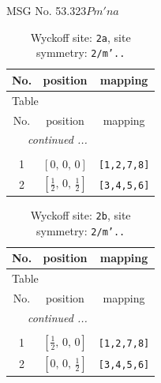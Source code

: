 \documentclass[fleqn,8pt]{jsarticle}
\begin{document}
\setcounter{MaxMatrixCols}{32}

\renewcommand{\tablename}{Table~}
\renewcommand{\figurename}{Figure~}
\begin{center}
\LARGE
MSG No. 53.323\quad$Pm'na$
\end{center}
\renewcommand{\arraystretch}{1.2}
\begin{longtable}{ccc}
\caption{Wyckoff site: {\tt 2a}, site symmetry: {\tt 2/m'..}}
 \\
 \hline \hline
No. & position & mapping \\ \hline \endfirsthead

\multicolumn{2}{l}{\tablename\ \thetable{}} \\
 \hline \hline
No. & position & mapping \\ \hline \endhead

 \hline \hline
\multicolumn{2}{r}{\footnotesize\it continued ...} \\ \endfoot

 \hline \hline
\multicolumn{2}{r}{} \\ \endlastfoot

1 & $\left[ 0,\, 0,\, 0 \right]$ & {\tt [1,2,7,8]} \\ \hline
2 & $\left[ \frac{1}{2},\, 0,\, \frac{1}{2} \right]$ & {\tt [3,4,5,6]} \\
\end{longtable}
\renewcommand{\arraystretch}{1.2}
\begin{longtable}{ccc}
\caption{Wyckoff site: {\tt 2b}, site symmetry: {\tt 2/m'..}}
 \\
 \hline \hline
No. & position & mapping \\ \hline \endfirsthead

\multicolumn{2}{l}{\tablename\ \thetable{}} \\
 \hline \hline
No. & position & mapping \\ \hline \endhead

 \hline \hline
\multicolumn{2}{r}{\footnotesize\it continued ...} \\ \endfoot

 \hline \hline
\multicolumn{2}{r}{} \\ \endlastfoot

1 & $\left[ \frac{1}{2},\, 0,\, 0 \right]$ & {\tt [1,2,7,8]} \\ \hline
2 & $\left[ 0,\, 0,\, \frac{1}{2} \right]$ & {\tt [3,4,5,6]} \\
\end{longtable}
\renewcommand{\arraystretch}{1.2}
\end{document}
